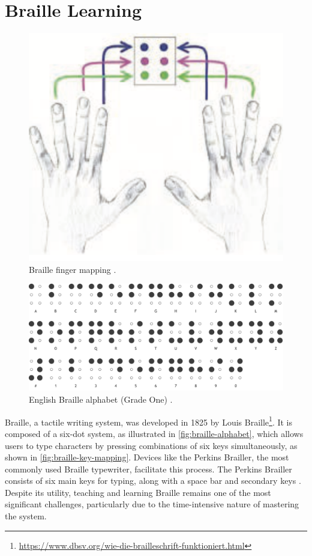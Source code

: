 \section{Braille Learning}
\begin{figure}
    \centering
    \includegraphics[width=0.5\linewidth]{src//pictures/Screenshot 2024-09-12 at 20.13.38.png}
    \caption{Braille finger mapping \cite{Seim2014a}.}
    \label{fig:braille-key-mapping}
\end{figure}
\begin{figure}
    \centering
    \includegraphics[width=0.5\linewidth]{src//pictures/braille_alphabet.png}
    \caption{English Braille alphabet (Grade One) \cite{pharmabrailleBrailleAlphabet,troughton1992guidelines}.}
    \label{fig:braille-alphabet}
\end{figure}
Braille, a tactile writing system, was developed in 1825 by Louis Braille\footnote{\url{https://www.dbsv.org/wie-die-brailleschrift-funktioniert.html}}. It is composed of a six-dot system, as illustrated in \autoref{fig:braille-alphabet}, which allows users to type characters by pressing combinations of six keys simultaneously, as shown in \autoref{fig:braille-key-mapping}. Devices like the Perkins Brailler, the most commonly used Braille typewriter, facilitate this process. The Perkins Brailler consists of six main keys for typing, along with a space bar and secondary keys \cite{Wikipedia2023}. Despite its utility, teaching and learning Braille remains one of the most significant challenges, particularly due to the time-intensive nature of mastering the system.

